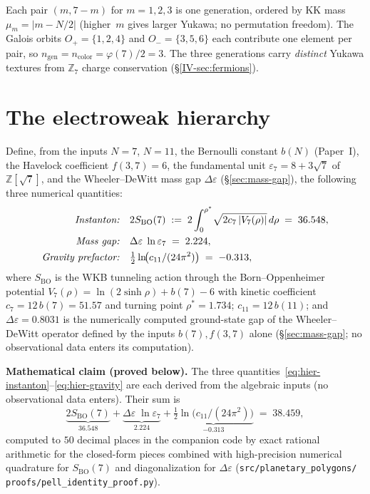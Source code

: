 \noindent
Each pair $(m, 7{-}m)$ for $m = 1, 2, 3$ is one generation,
ordered by KK mass $\mu_m = |m - N/2|$ (higher~$m$ gives
larger Yukawa; no permutation freedom).
The Galois orbits $O_+ = \{1, 2, 4\}$ and
$O_- = \{3, 5, 6\}$ each contribute one element per pair,
so $n_{\mathrm{gen}} = n_{\mathrm{color}} = \varphi(7)/2 = 3$.
The three generations carry \emph{distinct} Yukawa textures
from $\mathbb{Z}_7$ charge conservation
(\S\ref*{IV-sec:fermions}).

\section{The electroweak hierarchy}
\label{sec:hierarchy}

\begin{derivation}
\label{thm:hierarchy}
Define, from the inputs $N = 7$, $N = 11$, the Bernoulli
constant $b(N)$ (Paper~I), the Havelock coefficient
$f(3,7) = 6$, the fundamental unit
$\varepsilon_7 = 8 + 3\sqrt{7}$ of $\mathbb{Z}[\sqrt{7}]$,
and the Wheeler--DeWitt mass gap $\Delta\varepsilon$
(\S\ref{sec:mass-gap}), the following three numerical
quantities:
\begin{align}
  \text{\emph{Instanton:}}\quad
  & 2 S_{\mathrm{BO}}(7)
  \;:=\; 2\int_0^{\rho^*}\!\sqrt{2 c_7\,|V_7(\rho)|}\,d\rho
  \;=\; 36.548, \label{eq:hier-instanton} \\
  \text{\emph{Mass gap:}}\quad
  & \Delta\varepsilon\;\ln\varepsilon_7
  \;=\; 2.224, \label{eq:hier-gap} \\
  \text{\emph{Gravity prefactor:}}\quad
  & \tfrac{1}{2}\ln\!\bigl(c_{11}/(24\pi^2)\bigr)
  \;=\; -0.313, \label{eq:hier-gravity}
\end{align}
where $S_{\mathrm{BO}}$ is the WKB tunneling action through
the Born--Oppenheimer potential $V_7(\rho) = \ln(2\sinh\rho)
+ b(7) - 6$ with kinetic coefficient $c_7 = 12\,b(7) = 51.57$
and turning point $\rho^* = 1.734$; $c_{11} = 12\,b(11)$; and
$\Delta\varepsilon = 0.8031$ is the numerically computed
ground-state gap of the Wheeler--DeWitt operator defined by
the inputs $b(7), f(3,7)$ alone (\S\ref{sec:mass-gap}; no
observational data enters its computation).

\textbf{Mathematical claim (proved below).}
The three quantities~\eqref{eq:hier-instanton}--\eqref{eq:hier-gravity}
are each derived from the algebraic inputs (no observational
data enters).  Their sum is
\begin{equation}\label{eq:hierarchy}
  \underbrace{2S_{\mathrm{BO}}(7)}_{36.548}
  + \underbrace{\Delta\varepsilon\;\ln\varepsilon_7}_{2.224}
  + \underbrace{\tfrac{1}{2}\ln\!\bigl(c_{11}/(24\pi^2)\bigr)}_{-0.313}
  \;=\; 38.459,
\end{equation}
computed to $50$ decimal places in the companion code by
exact rational arithmetic for the closed-form pieces combined
with high-precision numerical quadrature for
$S_{\mathrm{BO}}(7)$ and diagonalization for
$\Delta\varepsilon$ (\texttt{src/planetary\_polygons/}
\texttt{proofs/pell\_identity\_proof.py}).


\end{derivation}
